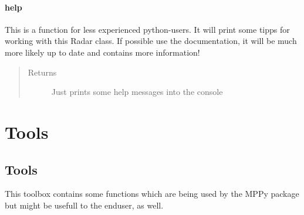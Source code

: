 \documentclass[letterpaper,10pt,english]{sphinxmanual}
\begin{document}
\begin{fulllineitems}
\begin{fulllineitems}
\end{fulllineitems}



\paragraph{help}
\label{\detokenize{generated/MPPy.Instruments.Radar.Radar.help::doc}}\label{\detokenize{generated/MPPy.Instruments.Radar.Radar.help:help}}

\begin{fulllineitems}
\label{\detokenize{generated/MPPy.Instruments.Radar.Radar.help:MPPy.Instruments.Radar.Radar.help}}
This is a function for less experienced python-users. It will print some tipps for working with this Radar
class. If possible use the documentation, it will be much more likely up to date and contains more information!
\begin{quote}\begin{description}
\item[{Returns}] \leavevmode
Just prints some help messages into the console

\end{description}\end{quote}

\end{fulllineitems}


\end{fulllineitems}



\section{Tools}
\label{\detokenize{modules:tools}}

\subsection{Tools}
\label{\detokenize{MPPy.tools::doc}}\label{\detokenize{MPPy.tools:tools}}\label{\detokenize{MPPy.tools:module-MPPy.tools.tools}}
This toolbox contains some functions which are being used by the MPPy package but might be usefull to the
enduser, as well.
\end{document}

